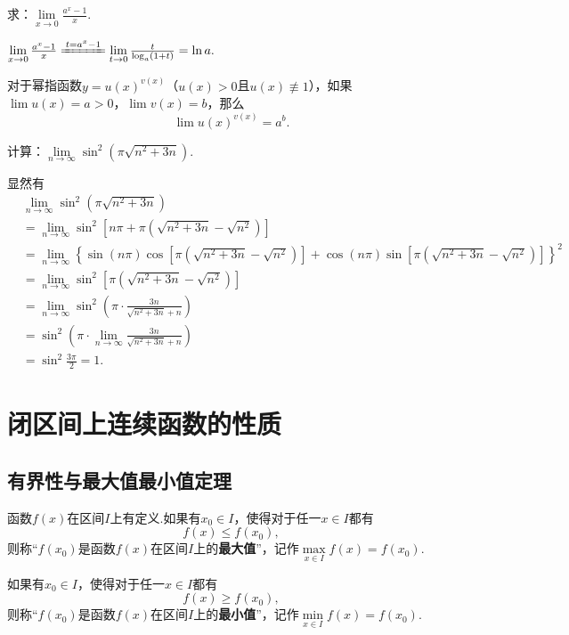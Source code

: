 \begin{example}
求：\(\lim\limits_{x\to0}\frac{a^x - 1}{x}\).
\begin{solution}
\(
\lim\limits_{x\to0}\frac{a^x - 1}{x}
\xlongequal{t=a^x-1} \lim\limits_{t\to0}\frac{t}{\log_a (1+t)}
= \ln a.
\)
\end{solution}
\end{example}

\begin{theorem}\label{theorem:极限.连续函数的极限7}
对于幂指函数\(y = u(x)^{v(x)}\)（\(u(x) > 0\)且\(u(x) \not\equiv 1\)），如果\(\lim u(x) = a > 0\)，\(\lim v(x) = b\)，那么\[
\lim u(x)^{v(x)} = a^b.
\]
\end{theorem}

\begin{example}
\def\l{\lim\limits_{n\to\infty}}
计算：\(\l \sin^2(\pi\sqrt{n^2+3n})\).
\begin{solution}
\def\a{\pi(\sqrt{n^2+3n}-\sqrt{n^2})}
显然有\begin{align*}
&\l \sin^2(\pi\sqrt{n^2+3n}) \\
&= \l \sin^2[n\pi+\a] \\
&= \l \left\{ \sin(n\pi) \cos\left[\a\right] + \cos(n\pi) \sin\left[\a\right] \right\}^2 \\
&= \l \sin^2\left[\a\right] \\
&= \l \sin^2\left( \pi \cdot \frac{3n}{\sqrt{n^2+3n}+n} \right) \\
&= \sin^2 \left( \pi \cdot \l \frac{3n}{\sqrt{n^2+3n}+n} \right) \\
&= \sin^2 \frac{3\pi}{2}
= 1.
\end{align*}
\end{solution}
\end{example}

\section{闭区间上连续函数的性质}
\subsection{有界性与最大值最小值定理}
\begin{definition}
函数\(f(x)\)在区间\(I\)上有定义.如果有\(x_0 \in I\)，使得对于任一\(x \in I\)都有\[
f(x) \leqslant f(x_0),
\]则称“\(f(x_0)\)是函数\(f(x)\)在区间\(I\)上的\textbf{最大值}”，记作\(\max\limits_{x \in I}f(x) = f(x_0)\).

如果有\(x_0 \in I\)，使得对于任一\(x \in I\)都有\[
f(x) \geqslant f(x_0),
\]则称“\(f(x_0)\)是函数\(f(x)\)在区间\(I\)上的\textbf{最小值}”，记作\(\min\limits_{x \in I}f(x) = f(x_0)\).
\end{definition}

